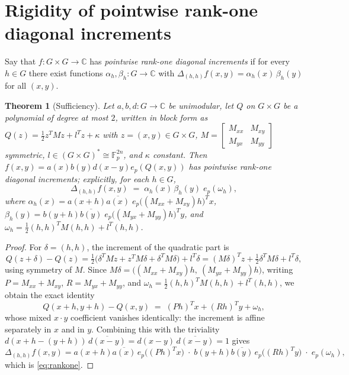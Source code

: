 \documentclass[11pt]{article}
\newtheorem{theorem}{Theorem}
\theoremstyle{remark}
\begin{document}
\section{Rigidity of pointwise rank-one diagonal increments}\label{sec:rigidity}

Say that $f:G\times G\to\mathbb{C}$ has \emph{pointwise rank-one diagonal
increments} if for every $h\in G$ there exist functions
$\alpha_h,\beta_h:G\to\mathbb{C}$ with
$\Delta_{(h,h)}f(x,y)=\alpha_h(x)\,\beta_h(y)$ for all $(x,y)$.

\begin{theorem}[Sufficiency]\label{thm:D}
Let $a,b,d:G\to\mathbb{C}$ be unimodular, let $Q$ on $G\times G$ be a
polynomial of degree at most $2$, written in block form as
$Q(z)=\tfrac12 z^{T}Mz+l^{T}z+\kappa$ with
$z=(x,y)\in G\times G$,
$M=\left[\begin{smallmatrix}M_{xx}&M_{xy}\\ M_{yx}&M_{yy}\end{smallmatrix}\right]$
symmetric, $l\in(G\times G)^{*}\cong\mathbb{F}_p^{2n}$, and $\kappa$
constant. Then
$f(x,y)=a(x)b(y)d(x-y)e_p(Q(x,y))$ has pointwise rank-one diagonal
increments; explicitly, for each $h\in G$,
\begin{equation}\label{eq:rankone}
\Delta_{(h,h)}f(x,y)\;=\;\alpha_h(x)\,\beta_h(y)\;e_p(\omega_h),
\end{equation}
where
$\alpha_h(x)=a(x+h)\overline{a(x)}\;e_p\bigl((M_{xx}+M_{xy})h\bigr)^{T}x$,
$\beta_h(y)=b(y+h)\overline{b(y)}\;e_p\bigl((M_{yx}+M_{yy})h\bigr)^{T}y$,
and $\omega_h=\tfrac12(h,h)^{T}M(h,h)+l^{T}(h,h)$.
\end{theorem}

\begin{proof}
For $\delta=(h,h)$, the increment of the quadratic part is
\[
Q(z+\delta)-Q(z)
=\tfrac12\bigl(\delta^{T}Mz+z^{T}M\delta+\delta^{T}M\delta\bigr)+l^{T}\delta
=(M\delta)^{T}z+\tfrac12\delta^{T}M\delta+l^{T}\delta ,
\]
using symmetry of $M$. Since $M\delta=
\bigl((M_{xx}+M_{xy})h,\ (M_{yx}+M_{yy})h\bigr)$, writing
$P=M_{xx}+M_{xy}$, $R=M_{yx}+M_{yy}$, and
$\omega_h=\tfrac12(h,h)^{T}M(h,h)+l^{T}(h,h)$, we obtain the exact identity
\[
Q(x+h,y+h)-Q(x,y)\;=\;(Ph)^{T}x+(Rh)^{T}y+\omega_h ,
\]
whose mixed $x{\cdot}y$ coefficient vanishes identically: the increment is
affine separately in $x$ and in $y$. Combining this with the triviality
$d(x+h-(y+h))\,\overline{d(x-y)}
=d(x-y)\,\overline{d(x-y)}=1$ gives
\[
\Delta_{(h,h)}f(x,y)
=a(x+h)\overline{a(x)}\,e_p\bigl((Ph)^{T}x\bigr)\;\cdot\;
b(y+h)\overline{b(y)}\,e_p\bigl((Rh)^{T}y\bigr)\;\cdot\;e_p(\omega_h),
\]
which is \eqref{eq:rankone}.
\end{proof}
\end{document}
